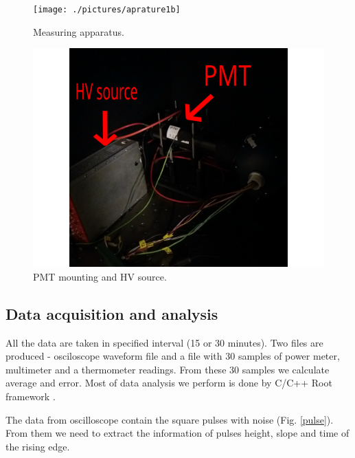 \begin{figure}[H]
 \centering
 \texttt{[image: ./pictures/aprature1b]}
 \caption{Measuring apparatus.}
 \label{aparature1}
\end{figure}

\begin{figure}[H]
 \centering
 \includegraphics[scale = 0.07]{./pictures/aparature2b}
 \caption{PMT mounting and HV source.}
 \label{aparature2}
\end{figure}


\subsection{Data acquisition and analysis}
All the data are taken in specified interval (15 or 30 minutes). Two files are produced - osciloscope waveform file and a file with 30 samples of power meter, multimeter and a thermometer readings. From these 30 samples we calculate average and error. Most of data analysis we perform is done by C/C++ Root framework \cite{ROOT}.
\par
The data from oscilloscope contain the square pulses with noise (Fig. \ref{pulse}). From them we need to extract the information of pulses height, slope and time of the rising edge.


